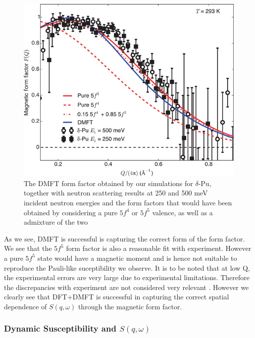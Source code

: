 \documentclass[10pt]{ruthesis}
\begin{document}
{\begin{figure}[H]
\includegraphics[scale=0.7]{formfactor_Pu.jpg}
\caption{The DMFT form factor obtained by our simulations for $\delta$-Pu, together with neutron scattering results at 250 and 500 meV incident neutron energies and the form factors that would have been obtained by considering a pure $5f^4$ or $5f^5$ valence, as well as a admixture of the two \label{Form_Pu}}
\end{figure}



 As we see, DMFT is successful is capturing the correct form of the form factor. We see that the $5f^5$ form factor is also a reasonable fit with experiment. However a pure $5f^5$ state would have a magnetic moment and is hence not suitable to reproduce the Pauli-like suceptibility we observe. It is to be noted that at low Q, the experimental errors are very large due to experimental limitations. Therefore the discrepancies with experiment are not considered very relevant . However we clearly see that DFT+DMFT is successful in capturing the correct spatial dependence of $S(q,\omega)$ through the magnetic form factor. 




\subsubsection{Dynamic Susceptibility and $S(q,\omega)$}

}
\end{document}
